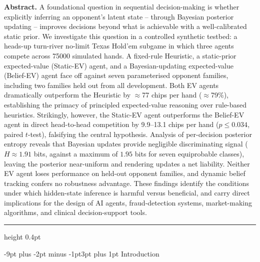 \documentclass[12pt]{article}
\makeatletter
\renewcommand\section{\@startsection{section}{1}{\z@}%
  {-9pt plus -2pt minus -1pt}{3pt plus 1pt}%
  {\normalfont\large\bfseries}}
\makeatother
\begin{document}
\begin{center}
  \begin{minipage}{0.88\textwidth}
    \small{}
    \textbf{Abstract.}
    A foundational question in sequential decision-making is whether
    explicitly inferring an opponent's latent state -- through Bayesian
    posterior updating -- improves decisions beyond what is achievable
    with a well-calibrated static prior.
    We investigate this question in a controlled synthetic testbed:
    a heads-up turn-river no-limit Texas Hold'em subgame in which
    three agents compete across \num{75000} simulated hands.
    A fixed-rule Heuristic, a static-prior expected-value (Static-EV)
    agent, and a Bayesian-updating expected-value (Belief-EV) agent
    face off against seven parameterised opponent families, including
    two families held out from all development.
    Both EV agents dramatically outperform the Heuristic by
    $\approx$77 chips per hand ($\approx$79\%), establishing the
    primacy of principled expected-value reasoning over rule-based
    heuristics.
    Strikingly, however, the Static-EV agent outperforms the
    Belief-EV agent in direct head-to-head competition by
    9.9--13.1 chips per hand ($p \leq 0.034$, paired $t$-test),
    falsifying the central hypothesis.
    Analysis of per-decision posterior entropy reveals that Bayesian
    updates provide negligible discriminating signal
    ($H \approx 1.91$ bits, against a maximum of $1.95$ bits for
    seven equiprobable classes), leaving the posterior near-uniform
    and rendering updates a net liability.
    Neither EV agent loses performance on held-out opponent families,
    and dynamic belief tracking confers no robustness advantage.
    These findings identify the conditions under which hidden-state
    inference is harmful versus beneficial, and carry direct
    implications for the design of AI agents, fraud-detection
    systems, market-making algorithms, and clinical decision-support
    tools.
  \end{minipage}
\end{center}

\vspace{8pt}
\hrule height 0.4pt

\newpage
\doublespacing

\section{Introduction}
\end{document}
